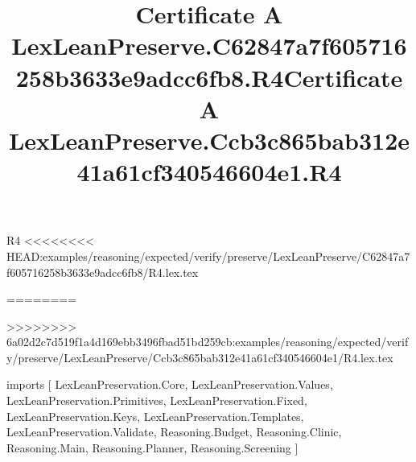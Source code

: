 \begin{lexlean}{R4}
<<<<<<<< HEAD:examples/reasoning/expected/verify/preserve/LexLeanPreserve/C62847a7f605716258b3633e9adcc6fb8/R4.lex.tex
\title{Certificate A LexLeanPreserve.C62847a7f605716258b3633e9adcc6fb8.R4}
========
\title{Certificate A LexLeanPreserve.Ccb3c865bab312e41a61cf340546604e1.R4}
>>>>>>>> 6a02d2c7d519f1a4d169ebb3496fbad51bd259cb:examples/reasoning/expected/verify/preserve/LexLeanPreserve/Ccb3c865bab312e41a61cf340546604e1/R4.lex.tex
\begin{coremodule}
imports [
  LexLeanPreservation.Core,
  LexLeanPreservation.Values,
  LexLeanPreservation.Primitives,
  LexLeanPreservation.Fixed,
  LexLeanPreservation.Keys,
  LexLeanPreservation.Templates,
  LexLeanPreservation.Validate,
  Reasoning.Budget,
  Reasoning.Clinic,
  Reasoning.Main,
  Reasoning.Planner,
  Reasoning.Screening
]


\end{coremodule}
\end{lexlean}
